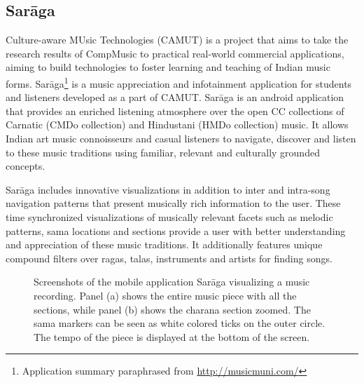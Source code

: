 \subsection{Sar\={a}ga}
Culture-aware MUsic Technologies (CAMUT) is a project that aims to take the research results of CompMusic to practical real-world commercial applications, aiming to build technologies to foster learning and teaching of Indian music forms. Sar\={a}ga\footnote{Application summary paraphrased from \url{http://musicmuni.com/}} is a music appreciation and infotainment application for students and listeners developed as a part of CAMUT. Sarāga is an android application that provides an enriched listening atmosphere over the open CC collections of Carnatic (\acrshort{CMDo} collection) and Hindustani (\acrshort{HMDo} collection) music. It allows Indian art music connoisseurs and casual listeners to navigate, discover and listen to these music traditions using familiar, relevant and culturally grounded concepts. 

Sarāga includes innovative visualizations in addition to inter and intra-song navigation patterns that present musically rich information to the user. These time synchronized visualizations of musically relevant facets such as melodic patterns, sama locations and sections provide a user with better understanding and appreciation of these music traditions. It additionally features unique compound filters over \glspl{raga}, \glspl{tala}, instruments and artists for finding songs. 
\begin{figure}
\centering
     \hspace{0.3cm}
\caption[Screenshots of Sar\={a}ga]{Screenshots of the mobile application Sar\={a}ga visualizing a music recording. Panel (a) shows the entire music piece with all the sections, while panel (b) shows the \gls{charana} section zoomed. The sama markers can be seen as white colored ticks on the outer circle. The tempo of the piece is displayed at the bottom of the screen.}\label{fig:saraga:all}
\end{figure}

